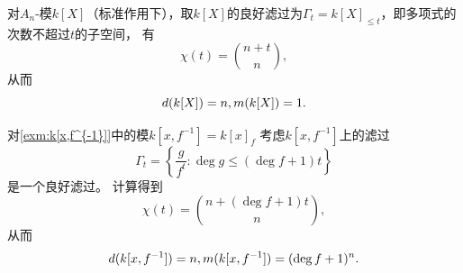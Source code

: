 \begin{example}
\begin{example}
    对$A_n$-模$k[X]$（标准作用下），取$k[X]$的良好滤过为$\Gamma_t=k[X]_{\le t}$，即多项式的次数不超过$t$的子空间，
    有
    \begin{equation*}
        \chi(t)=\binom{n+t}{n},
    \end{equation*}
    从而
    \begin{equation*}
        d(k[X])=n,
        \\
        m(k[X])=1.
    \end{equation*}
\end{example}

\begin{example}
    对\ref{exm:k[x,f^{-1}]}中的模$k[x,f^{-1}]=k[x]_{f}$
    考虑$k[x,f^{-1}]$上的滤过
    \begin{equation*}
        \Gamma_t=\left\{\frac{g}{f^t}:\deg g \leq (\deg f +1)t\right\}
    \end{equation*}
    是一个良好滤过。
    计算得到
    \begin{equation*}
        \chi(t)=\binom{n+(\deg f +1)t}{n},
    \end{equation*}
    从而 \begin{equation*}
        d(k[x,f^{-1}])=n,
        \\
        m(k[x,f^{-1}])=(\deg f +1)^n.
    \end{equation*}
\end{example}


\end{example}
